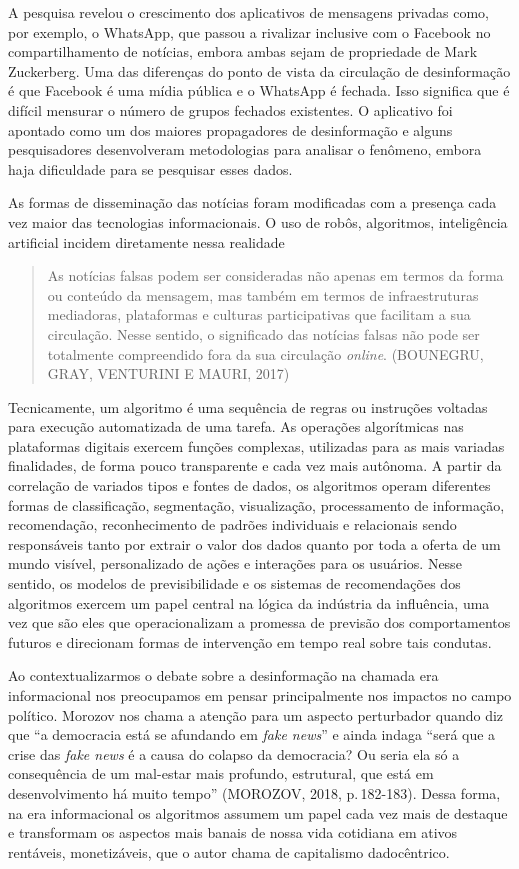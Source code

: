 A pesquisa revelou o crescimento dos aplicativos de mensagens privadas
como, por exemplo, o WhatsApp, que passou a rivalizar inclusive com o
Facebook no compartilhamento de notícias, embora ambas sejam de
propriedade de Mark Zuckerberg. Uma das diferenças do ponto de vista da
circulação de desinformação é que Facebook é uma mídia pública e o
WhatsApp é fechada. Isso significa que é difícil mensurar o número de
grupos fechados existentes. O aplicativo foi apontado como um dos
maiores propagadores de desinformação e alguns pesquisadores
desenvolveram metodologias para analisar o fenômeno, embora haja
dificuldade para se pesquisar esses dados.

As formas de disseminação das notícias foram modificadas com a presença
cada vez maior das tecnologias informacionais. O uso de robôs,
algoritmos, inteligência artificial incidem diretamente nessa realidade

\begin{quote}
As notícias falsas podem ser consideradas não apenas em termos da forma
ou conteúdo da mensagem, mas também em termos de infraestruturas
mediadoras, plataformas e culturas participativas que facilitam a sua
circulação. Nesse sentido, o significado das notícias falsas não pode
ser totalmente compreendido fora da sua circulação \textit{online}. (BOUNEGRU,
GRAY, VENTURINI E MAURI, 2017)
\end{quote}

Tecnicamente, um algoritmo é uma sequência de regras ou instruções
voltadas para execução automatizada de uma tarefa. As operações
algorítmicas nas plataformas digitais exercem funções complexas,
utilizadas para as mais variadas finalidades, de forma pouco
transparente e cada vez mais autônoma. A partir da correlação de
variados tipos e fontes de dados, os algoritmos operam diferentes formas
de classificação, segmentação, visualização, processamento de
informação, recomendação, reconhecimento de padrões individuais e
relacionais sendo responsáveis tanto por extrair o valor dos dados
quanto por toda a oferta de um mundo visível, personalizado de ações e
interações para os usuários. Nesse sentido, os modelos de
previsibilidade e os sistemas de recomendações dos algoritmos exercem um
papel central na lógica da indústria da influência, uma vez que são eles
que operacionalizam a promessa de previsão dos comportamentos futuros e
direcionam formas de intervenção em tempo real sobre tais condutas.

Ao contextualizarmos o debate sobre a desinformação na chamada era
informacional nos preocupamos em pensar principalmente nos impactos no
campo político. Morozov nos chama a atenção para um aspecto perturbador
quando diz que ``a democracia está se afundando em \textit{fake news}'' e ainda indaga ``será que a crise das \textit{fake news} é
a causa do colapso da democracia? Ou seria ela só a consequência de um
mal-estar mais profundo, estrutural, que está em desenvolvimento há
muito tempo'' (MOROZOV, 2018, p.\,182-183). Dessa forma, na era
informacional os algoritmos assumem um papel cada vez mais de destaque e
transformam os aspectos mais banais de nossa vida cotidiana em ativos
rentáveis, monetizáveis, que o autor chama de capitalismo dadocêntrico.

